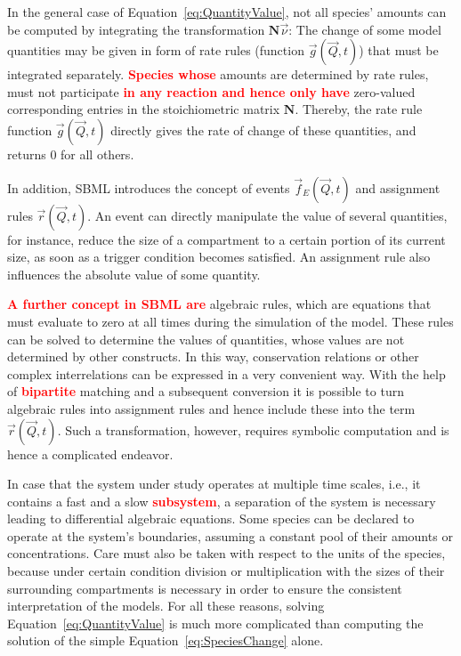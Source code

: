 \documentclass[10pt]{bmc_article}
\newenvironment{bmcformat}{\baselineskip20pt\sloppy\setboolean{publ}{false}}{\baselineskip20pt\sloppy}
\newcommand{\TODO}[1]{\textcolor{red}{\textbf{#1}}}
\begin{document}
\begin{bmcformat}
In the general case of Equation~\ref{eq:QuantityValue}, not all species' amounts
can be computed by integrating the transformation $\mathbf{N}\vec{\nu}$: The
change of some model quantities may be given in form of rate rules (function
$\vec{g}(\vec{Q}, t)$) that must be integrated separately.
\TODO{Species whose} amounts are determined by rate rules, must not participate \TODO{in any
reaction and hence only have} zero-valued corresponding entries in the
stoichiometric matrix $\mathbf{N}$.
Thereby, the rate rule function $\vec{g}(\vec{Q}, t)$ directly gives the rate of
change of these quantities, and returns 0 for all others.

In addition, SBML introduces the concept of events $\vec{f}_E(\vec{Q}, t)$ and
assignment rules $\vec{r}(\vec{Q}, t)$.
An event can directly manipulate the value of several quantities, for instance,
reduce the size of a compartment to a certain portion of its current size,
as soon as a trigger condition becomes satisfied.
An assignment rule also influences the absolute value of some quantity.

\TODO{A further concept in SBML are} algebraic rules, which are equations that
must evaluate to zero at all times during the simulation of the model.
These rules can be solved to determine the values of quantities, whose values
are not determined by other constructs.
In this way, conservation relations or other complex interrelations can be
expressed in a very convenient way.
With the help of \TODO{bipartite} matching and a subsequent conversion it is possible
to turn algebraic rules into assignment rules and hence include these into the
term $\vec{r}(\vec{Q}, t)$.
Such a transformation, however, requires symbolic computation and is
hence a complicated endeavor.

In case that the system under study operates at multiple time scales, i.e., it
contains a fast and a slow \TODO{subsystem}, a separation of the system is necessary
leading to differential algebraic equations.
Some species can be declared to operate at the system's boundaries, assuming a
constant pool of their amounts or concentrations.
Care must also be taken with respect to the units of the species, because under
certain condition division or multiplication with the sizes of their surrounding
compartments is necessary in order to ensure the consistent interpretation of
the models. 
For all these reasons, solving Equation~\ref{eq:QuantityValue} is much more 
complicated than computing the solution of the simple Equation~\ref{eq:SpeciesChange}
alone.


\end{bmcformat}
\end{document}
